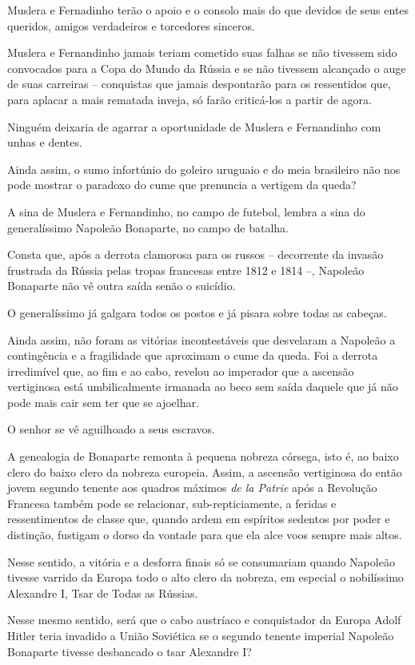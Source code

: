 Muslera e Fernadinho terão o apoio e o consolo mais do que devidos de
seus entes queridos, amigos verdadeiros e torcedores sinceros.

Muslera e Fernandinho jamais teriam cometido suas falhas se não tivessem
sido convocados para a Copa do Mundo da Rússia e se não tivessem
alcançado o auge de suas carreiras -- conquistas que jamais despontarão
para os ressentidos que, para aplacar a mais rematada inveja, só farão
criticá-los a partir de agora.

Ninguém deixaria de agarrar a oportunidade de Muslera e Fernandinho com
unhas e dentes.

Ainda assim, o sumo infortúnio do goleiro uruguaio e do meia brasileiro
não nos pode mostrar o paradoxo do cume que prenuncia a vertigem da
queda?

A sina de Muslera e Fernandinho, no campo de futebol, lembra a sina do
generalíssimo Napoleão Bonaparte, no campo de batalha.

Consta que, após a derrota clamorosa para os russos -- decorrente da
invasão frustrada da Rússia pelas tropas francesas entre 1812 e 1814 --,
Napoleão Bonaparte não vê outra saída senão o suicídio.

O generalíssimo já galgara todos os postos e já pisara sobre todas as
cabeças.

Ainda assim, não foram as vitórias incontestáveis que desvelaram a
Napoleão a contingência e a fragilidade que aproximam o cume da queda.
Foi a derrota irredimível que, ao fim e ao cabo, revelou ao imperador
que a ascensão vertiginosa está umbilicalmente irmanada ao beco sem
saída daquele que já não pode mais cair sem ter que se ajoelhar.

O senhor se vê aguilhoado a seus escravos.

A genealogia de Bonaparte remonta à pequena nobreza córsega, isto é, ao
baixo clero do baixo clero da nobreza europeia. Assim, a ascensão
vertiginosa do então jovem segundo tenente aos quadros máximos \emph{de
la Patrie} após a Revolução Francesa também pode se relacionar,
sub-repticiamente, a feridas e ressentimentos de classe que, quando
ardem em espíritos sedentos por poder e distinção, fustigam o dorso da
vontade para que ela alce voos sempre mais altos.

Nesse sentido, a vitória e a desforra finais só se consumariam quando
Napoleão tivesse varrido da Europa todo o alto clero da nobreza, em
especial o nobilíssimo Alexandre I, Tsar de Todas as Rússias.

Nesse mesmo sentido, será que o cabo austríaco e conquistador da Europa
Adolf Hitler teria invadido a União Soviética se o segundo tenente
imperial Napoleão Bonaparte tivesse desbancado o tsar Alexandre I?

